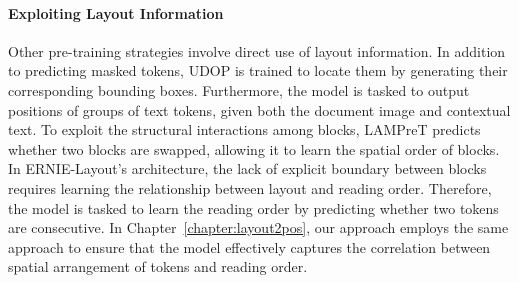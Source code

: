 
\paragraph{Exploiting Layout Information}

Other pre-training strategies involve direct use of layout information. In addition to predicting masked tokens, UDOP \citep{tang2023unifying} is trained to locate them by generating their corresponding bounding boxes. Furthermore, the model is tasked to output positions of groups of text tokens, given both the document image and contextual text.
To exploit the structural interactions among blocks, \ac{LAMPreT} predicts whether two blocks are swapped, allowing it to learn the spatial order of blocks.
In ERNIE-Layout's architecture, the lack of explicit boundary between blocks requires learning the relationship between layout and reading order. Therefore, the model is tasked to learn the reading order by predicting whether two tokens are consecutive. In Chapter~\ref{chapter:layout2pos}, our approach employs the same approach to ensure that the model effectively captures the correlation between spatial arrangement of tokens and reading order. 

